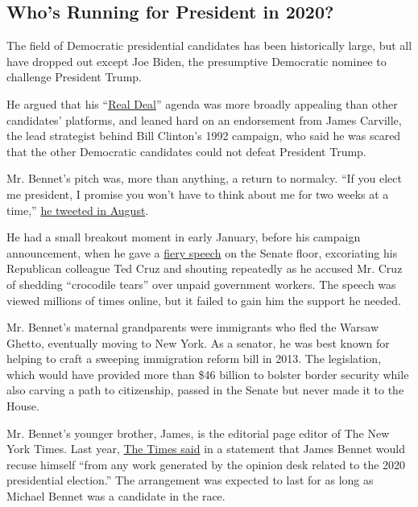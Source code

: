 \hypertarget{whos-running-for-president-in-2020}{%
\subsection{Who's Running for President in
2020?}\label{whos-running-for-president-in-2020}}

The field of Democratic presidential candidates has been historically
large, but all have dropped out except Joe Biden, the presumptive
Democratic nominee to challenge President Trump.

He argued that his ``\href{https://michaelbennet.com/RealDeal/}{Real
Deal}'' agenda was more broadly appealing than other candidates'
platforms, and leaned hard on an endorsement from James Carville, the
lead strategist behind Bill Clinton's 1992 campaign, who said he was
scared that the other Democratic candidates could not defeat President
Trump.

Mr. Bennet's pitch was, more than anything, a return to normalcy. ``If
you elect me president, I promise you won't have to think about me for
two weeks at a time,''
\href{https://twitter.com/MichaelBennet/status/1158806845953323008?s=20}{he
tweeted in August}.

He had a small breakout moment in early January, before his campaign
announcement, when he gave a
\href{https://www.youtube.com/watch?v=78dsjOIE5L8\&feature=youtu.be}{fiery
speech} on the Senate floor, excoriating his Republican colleague Ted
Cruz and shouting repeatedly as he accused Mr. Cruz of shedding
``crocodile tears'' over unpaid government workers. The speech was
viewed millions of times online, but it failed to gain him the support
he needed.

Mr. Bennet's maternal grandparents were immigrants who fled the Warsaw
Ghetto, eventually moving to New York. As a senator, he was best known
for helping to craft a sweeping immigration reform bill in 2013. The
legislation, which would have provided more than \$46 billion to bolster
border security while also carving a path to citizenship, passed in the
Senate but never made it to the House.

Mr. Bennet's younger brother, James, is the editorial page editor of The
New York Times. Last year,
\href{https://www.nytimes3xbfgragh.onion/2019/05/02/business/media/james-michael-bennet-new-york-times.html}{The
Times said} in a statement that James Bennet would recuse himself ``from
any work generated by the opinion desk related to the 2020 presidential
election.'' The arrangement was expected to last for as long as Michael
Bennet was a candidate in the race.

